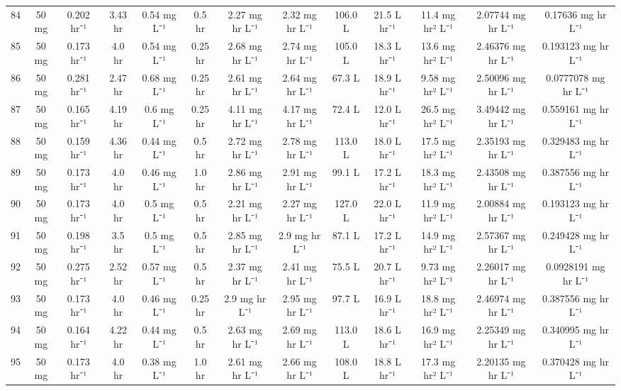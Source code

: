 \documentclass[12pt,a4paper]{article}
\begin{document}
\begin{tabular}{r|cccccccccccc}
	84 & 50 mg & 0.202 hr⁻¹ & 3.43 hr & 0.54 mg L⁻¹ & 0.5 hr & 2.27 mg hr L⁻¹ & 2.32 mg hr L⁻¹ & 106.0 L & 21.5 L hr⁻¹ & 11.4 mg hr² L⁻¹ & 2.07744 mg hr L⁻¹ & 0.17636 mg hr L⁻¹ \\
	85 & 50 mg & 0.173 hr⁻¹ & 4.0 hr & 0.54 mg L⁻¹ & 0.25 hr & 2.68 mg hr L⁻¹ & 2.74 mg hr L⁻¹ & 105.0 L & 18.3 L hr⁻¹ & 13.6 mg hr² L⁻¹ & 2.46376 mg hr L⁻¹ & 0.193123 mg hr L⁻¹ \\
	86 & 50 mg & 0.281 hr⁻¹ & 2.47 hr & 0.68 mg L⁻¹ & 0.25 hr & 2.61 mg hr L⁻¹ & 2.64 mg hr L⁻¹ & 67.3 L & 18.9 L hr⁻¹ & 9.58 mg hr² L⁻¹ & 2.50096 mg hr L⁻¹ & 0.0777078 mg hr L⁻¹ \\
	87 & 50 mg & 0.165 hr⁻¹ & 4.19 hr & 0.6 mg L⁻¹ & 0.25 hr & 4.11 mg hr L⁻¹ & 4.17 mg hr L⁻¹ & 72.4 L & 12.0 L hr⁻¹ & 26.5 mg hr² L⁻¹ & 3.49442 mg hr L⁻¹ & 0.559161 mg hr L⁻¹ \\
	88 & 50 mg & 0.159 hr⁻¹ & 4.36 hr & 0.44 mg L⁻¹ & 0.5 hr & 2.72 mg hr L⁻¹ & 2.78 mg hr L⁻¹ & 113.0 L & 18.0 L hr⁻¹ & 17.5 mg hr² L⁻¹ & 2.35193 mg hr L⁻¹ & 0.329483 mg hr L⁻¹ \\
	89 & 50 mg & 0.173 hr⁻¹ & 4.0 hr & 0.46 mg L⁻¹ & 1.0 hr & 2.86 mg hr L⁻¹ & 2.91 mg hr L⁻¹ & 99.1 L & 17.2 L hr⁻¹ & 18.3 mg hr² L⁻¹ & 2.43508 mg hr L⁻¹ & 0.387556 mg hr L⁻¹ \\
	90 & 50 mg & 0.173 hr⁻¹ & 4.0 hr & 0.5 mg L⁻¹ & 0.5 hr & 2.21 mg hr L⁻¹ & 2.27 mg hr L⁻¹ & 127.0 L & 22.0 L hr⁻¹ & 11.9 mg hr² L⁻¹ & 2.00884 mg hr L⁻¹ & 0.193123 mg hr L⁻¹ \\
	91 & 50 mg & 0.198 hr⁻¹ & 3.5 hr & 0.5 mg L⁻¹ & 0.5 hr & 2.85 mg hr L⁻¹ & 2.9 mg hr L⁻¹ & 87.1 L & 17.2 L hr⁻¹ & 14.9 mg hr² L⁻¹ & 2.57367 mg hr L⁻¹ & 0.249428 mg hr L⁻¹ \\
	92 & 50 mg & 0.275 hr⁻¹ & 2.52 hr & 0.57 mg L⁻¹ & 0.5 hr & 2.37 mg hr L⁻¹ & 2.41 mg hr L⁻¹ & 75.5 L & 20.7 L hr⁻¹ & 9.73 mg hr² L⁻¹ & 2.26017 mg hr L⁻¹ & 0.0928191 mg hr L⁻¹ \\
	93 & 50 mg & 0.173 hr⁻¹ & 4.0 hr & 0.46 mg L⁻¹ & 0.25 hr & 2.9 mg hr L⁻¹ & 2.95 mg hr L⁻¹ & 97.7 L & 16.9 L hr⁻¹ & 18.8 mg hr² L⁻¹ & 2.46974 mg hr L⁻¹ & 0.387556 mg hr L⁻¹ \\
	94 & 50 mg & 0.164 hr⁻¹ & 4.22 hr & 0.44 mg L⁻¹ & 0.5 hr & 2.63 mg hr L⁻¹ & 2.69 mg hr L⁻¹ & 113.0 L & 18.6 L hr⁻¹ & 16.9 mg hr² L⁻¹ & 2.25349 mg hr L⁻¹ & 0.340995 mg hr L⁻¹ \\
	95 & 50 mg & 0.173 hr⁻¹ & 4.0 hr & 0.38 mg L⁻¹ & 1.0 hr & 2.61 mg hr L⁻¹ & 2.66 mg hr L⁻¹ & 108.0 L & 18.8 L hr⁻¹ & 17.3 mg hr² L⁻¹ & 2.20135 mg hr L⁻¹ & 0.370428 mg hr L⁻¹ \\

\end{tabular}
\end{document}
